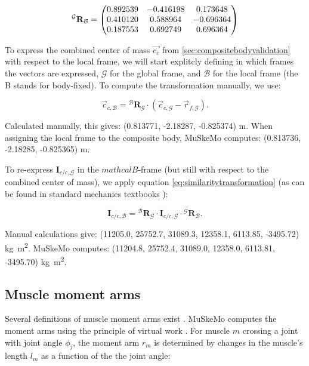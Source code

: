 \documentclass{article}
\begin{document}
\begin{equation}
    {}^{\mathcal{G}} \mathbf{R}_{\mathcal{B}} =
    \mqty(
    0.892539 & -0.416198 & 0.173648 \\
    0.410120 & 0.588964 & -0.696364 \\
    0.187553 & 0.692749 & 0.696364
    )
\end{equation}

To express the combined center of mass \(\vec{c_{c}}\) from \ref{sec:compositebodyvalidation} with respect to the local frame, we will start explitcly defining in which frames the vectors are expressed, \(\mathcal{G}\) for the global frame, and \(\mathcal{B}\) for the local frame (the B stands for body-fixed). To compute the transformation manually, we use:

\begin{equation}
\vec{c}_{c,\mathcal{B}} = {}^{\mathcal{B}} \mathbf{R}_{\mathcal{G}} \cdot (\vec{c}_{c,\mathcal{G}} - \vec{r}_{f,\mathcal{G}}).
\end{equation}

Calculated manually, this gives: (0.813771, -2.18287, -0.825374) \si{m}. When assigning the local frame to the composite body, MuSkeMo computes: (0.813736, -2.18285, -0.825365) \si{m}. 

To re-express \(\mathbf{I}_{c/c,{\mathcal{G}}}\) in the \(mathcal{B}\)-frame (but still with respect to the combined center of mass), we apply equation \ref{eq:similaritytransformation} (as can be found in standard mechanics textbooks \cite{valleryAdvancedDynamics2019}):

\begin{equation}
    \mathbf{I}_{c/c,{\mathcal{B}}} = {}^{\mathcal{B}} \mathbf{R}_{\mathcal{G}} \cdot \mathbf{I}_{c/c,{\mathcal{G}}} \cdot {}^{\mathcal{G}} \mathbf{R}_{\mathcal{B}}.
\end{equation}

Manual calculations give: (11205.0, 25752.7, 31089.3, 12358.1, 6113.85, -3495.72) \si{kg m^2}. MuSkeMo computes: (11204.8, 25752.4, 31089.0, 12358.0, 6113.81, -3495.70) \si{kg m^2}.


\subsection{Muscle moment arms}
\label{sec:momentarmvalidation}

Several definitions of muscle moment arms exist \cite{anDeterminationMuscleOrientations1984}. MuSkeMo computes the moment arms using the principle of virtual work \cite{anDeterminationMuscleOrientations1984,storaceFunctionalAnalysisRole1979}. For muscle \(m\) crossing a joint with joint angle \(\phi_j\), the moment arm \(r_m\) is determined by changes in the muscle's length \(l_m\) as a function of the the joint angle:
\end{document}
